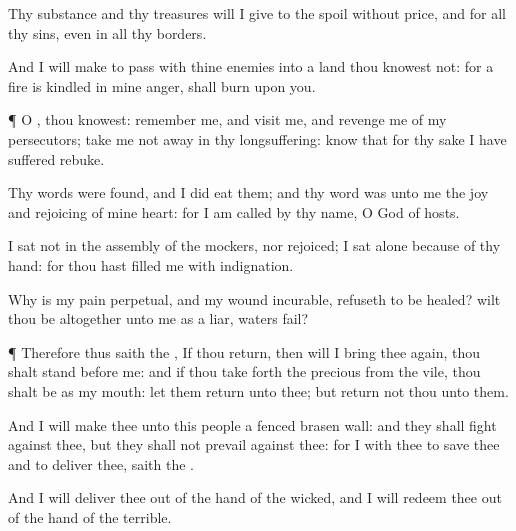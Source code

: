 {Thy
substance and thy
treasures will I
give to the
spoil without
price, and
{} for all thy
sins, even in all thy
borders.

And I will make
{} to
pass with thine
enemies into a
land
{} thou
knowest not: for a
fire is
kindled in mine
anger,
{} shall
burn upon you.


\par }{\PP {}¶ O
{}, thou
knowest:
remember me, and
visit me, and
revenge me of my
persecutors; take me not
away in thy
longsuffering:
know that for thy sake I have
suffered
rebuke.

Thy
words were
found, and I did
eat them; and thy
word was unto me the
joy and
rejoicing of mine
heart: for I am
called by thy
name, O
{}
God of
hosts.

I
sat not in the
assembly of the
mockers, nor
rejoiced; I
sat
alone
because of thy
hand: for thou hast
filled me with
indignation.

Why is my
pain
perpetual, and my
wound
incurable,
{}
refuseth to be
healed? wilt thou be altogether unto me as a
liar,
{}
waters
{}
fail?


\par }{\PP {}¶ Therefore thus
saith the
{}, If thou
return, then will I bring thee
again,
{} thou shalt
stand
before me: and if thou take
forth the
precious from the
vile, thou shalt be as my
mouth: let them
return unto thee; but
return not thou unto them.

And I will
make thee unto this
people a
fenced
brasen
wall: and they shall
fight against thee, but they shall not
prevail against thee: for I
{} with thee to
save thee and to
deliver thee,
saith the
{}.

And I will
deliver thee out of the
hand of the
wicked, and I will
redeem thee out of the
hand of the
terrible.




\par }
